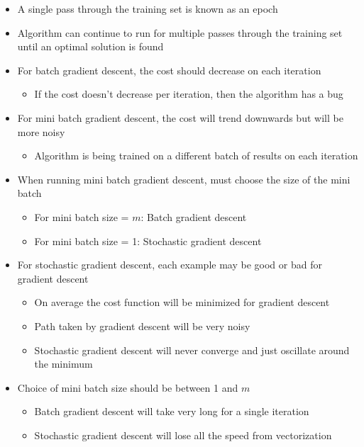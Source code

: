\documentclass[12pt, letterpaper]{article}
\begin{document}
\begin{itemize}
\begin{itemize}
        \end{itemize}
        \item A single pass through the training set is known as an epoch
        \item Algorithm can continue to run for multiple passes through the training set until an optimal solution is found
        \item For batch gradient descent, the cost should decrease on each iteration
        \begin{itemize}
            \item If the cost doesn't decrease per iteration, then the algorithm has a bug
        \end{itemize}
        \item For mini batch gradient descent, the cost will trend downwards but will be more noisy
        \begin{itemize}
            \item Algorithm is being trained on a different batch of results on each iteration
        \end{itemize}
        \item When running mini batch gradient descent, must choose the size of the mini batch
        \begin{itemize}
            \item For mini batch size = $m$: Batch gradient descent
            \item For mini batch size = 1: Stochastic gradient descent
        \end{itemize}
        \item For stochastic gradient descent, each example may be good or bad for gradient descent
        \begin{itemize}
            \item On average the cost function will be minimized for gradient descent
            \item Path taken by gradient descent will be very noisy
            \item Stochastic gradient descent will never converge and just oscillate around the minimum
        \end{itemize}
        \item Choice of mini batch size should be between 1 and $m$
        \begin{itemize}
            \item Batch gradient descent will take very long for a single iteration
            \item Stochastic gradient descent will lose all the speed from vectorization

\end{itemize}
\end{itemize}
\end{document}
